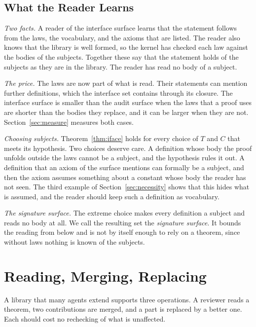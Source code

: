 \documentclass[acmsmall,nonacm,screen]{acmart}
\begin{document}
\subsection{What the Reader Learns}
\label{sec:reading}

\emph{Two facts.} A reader of the interface surface learns that the statement follows from the
laws, the vocabulary, and the axioms that are listed. The reader also knows that the library is
well formed, so the kernel has checked each law against the bodies of the subjects. Together
these say that the statement holds of the subjects as they are in the library. The reader has
read no body of a subject.

\emph{The price.} The laws are now part of what is read. Their statements can mention further
definitions, which the interface set contains through its closure. The interface surface is
smaller than the audit surface when the laws that a proof uses are shorter than the bodies they
replace, and it can be larger when they are not. Section~\ref{sec:measure} measures both cases.

\emph{Choosing subjects.} Theorem~\ref{thm:iface} holds for every choice of $T$ and $C$ that
meets its hypothesis. Two choices deserve care. A definition whose body the proof unfolds
outside the laws cannot be a subject, and the hypothesis rules it out. A definition that an
axiom of the surface mentions can formally be a subject, and then the axiom assumes something
about a constant whose body the reader has not seen. The third example of
Section~\ref{sec:necessity} shows that this hides what is assumed, and the reader should keep
such a definition as vocabulary.

\emph{The signature surface.} The extreme choice makes every definition a subject and reads no
body at all. We call the resulting set the \emph{signature surface}. It bounds the reading from
below and is not by itself enough to rely on a theorem, since without laws nothing is known of
the subjects.

\section{Reading, Merging, Replacing}
\label{sec:structural}

A library that many agents extend supports three operations. A reviewer reads a theorem, two
contributions are merged, and a part is replaced by a better one. Each should cost no rechecking
of what is unaffected.
\end{document}
